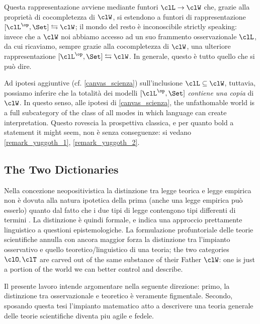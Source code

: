 Questa rappresentazione avviene mediante funtori $\clL \to \clW$ che, grazie alla proprietà di cocompletezza di $\clW$, si estendono a funtori di rappresentazione $[\clL^\op,\Set] \leftrightarrows \clW$; il mondo del resto è inconoscibile strictly speaking: invece che a $\clW$ noi abbiamo accesso ad un suo frammento osservazionale $\clL$, da cui ricaviamo, sempre grazie alla cocompletezza di $\clW$, una ulteriore rappresentazione $[\clL^\op,\Set] \leftrightarrows \clW$. In generale, questo è tutto quello che si può dire. 

Ad ipotesi aggiuntive (cf. \autoref{canvas_scienza}) sull'inclusione $\clL\subseteq \clW$, tuttavia, possiamo inferire che la totalità dei modelli $[\clL^\op,\Set]$ \emph{contiene una copia} di $\clW$. In questo senso, alle ipotesi di \autoref{canvas_scienza}, the unfathomable world is a full subcategory of the class of all modes in which language can create interpretation. Questo rovescia la prospettiva classica, e per quanto bold a statement it might seem, non è senza conseguenze: si vedano \autoref{remark_yuggoth_1}, \autoref{remark_yuggoth_2}.

\subsection{The Two Dictionaries}
Nella concezione neopositivistica la distinzione tra legge teorica e legge empirica non è dovuta alla natura ipotetica della prima (anche una legge empirica può esserlo) quanto dal fatto che i due tipi di legge contengono tipi differenti di termini \cite{?}. La distinzione è quindi formale, e indica una approccio prettamente linguistico a questioni epistemologiche. La formulazione profuntoriale delle teorie scientifiche annulla con ancora maggior forza la distinzione tra l'impianto osservativo e quello teoretico/linguistico di una teoria; the two categories $\clO,\clT$ are carved out of the same substance of their Father $\clW$: one is just a portion of the world we can better control and describe.

Il presente lavoro intende argomentare nella seguente direzione: primo, la distinzione tra osservazionale e teoretico è veramente figmentale. Secondo, sposando questa tesi l'impianto matematico atto a descrivere una teoria generale delle teorie scientifiche diventa piu agile e fedele.

